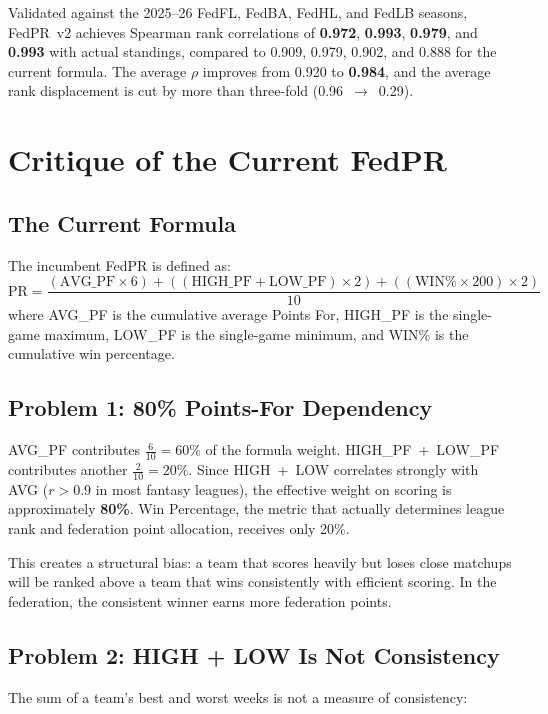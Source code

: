 \documentclass[11pt,a4paper]{article}
\begin{document}
Validated against the 2025--26 FedFL, FedBA, FedHL, and FedLB seasons, FedPR~v2 achieves Spearman rank correlations of \textbf{0.972}, \textbf{0.993}, \textbf{0.979}, and \textbf{0.993} with actual standings, compared to 0.909, 0.979, 0.902, and 0.888 for the current formula. The average $\rho$ improves from 0.920 to \textbf{0.984}, and the average rank displacement is cut by more than three-fold (0.96~$\to$~0.29).


\section{Critique of the Current FedPR}

\subsection{The Current Formula}

The incumbent FedPR is defined as:
\[
\text{PR} = \frac{(\text{AVG\_PF} \times 6) + ((\text{HIGH\_PF} + \text{LOW\_PF}) \times 2) + ((\text{WIN\%} \times 200) \times 2)}{10}
\]
where AVG\_PF is the cumulative average Points For, HIGH\_PF is the single-game maximum, LOW\_PF is the single-game minimum, and WIN\% is the cumulative win percentage.

\subsection{Problem 1: 80\% Points-For Dependency}

AVG\_PF contributes $\tfrac{6}{10} = 60\%$ of the formula weight. HIGH\_PF~+~LOW\_PF contributes another $\tfrac{2}{10} = 20\%$. Since HIGH~+~LOW correlates strongly with AVG ($r > 0.9$ in most fantasy leagues), the effective weight on scoring is approximately \textbf{80\%}. Win Percentage, the metric that actually determines league rank and federation point allocation, receives only 20\%.

This creates a structural bias: a team that scores heavily but loses close matchups will be ranked above a team that wins consistently with efficient scoring. In the federation, the consistent winner earns more federation points.

\subsection{Problem 2: HIGH + LOW Is Not Consistency}

The sum of a team's best and worst weeks is not a measure of consistency:
\end{document}
